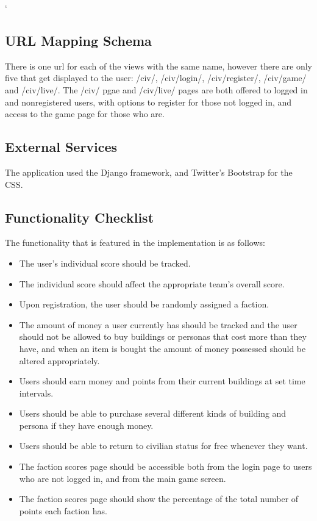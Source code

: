 `\documentclass{sig-alt-release2}
\begin{document}
\subsection{URL Mapping Schema}

There is one url for each of the views with the same name, however there are only five that get displayed to the user: /civ/, /civ/login/, /civ/register/, /civ/game/ and /civ/live/. The /civ/ pgae and /civ/live/ pages are both offered to logged in and nonregistered users, with options to register for those not logged in, and access to the game page for those who are.

\subsection{External Services}

The application used the Django framework, and Twitter's Bootstrap for the CSS. 

\subsection{Functionality Checklist}

The functionality that is featured in the implementation is as follows:

\begin{itemize}

\item The user's individual score should be tracked.

\item The individual score should affect the appropriate team's overall score.

\item Upon registration, the user should be randomly assigned a faction.

\item The amount of money a user currently has should be tracked and the user should not be allowed to buy buildings or personas that cost more than they have, and when an item is bought the amount of money possessed should be altered appropriately.

\item Users should earn money and points from their current buildings at set time intervals.

\item Users should be able to purchase several different kinds of building and persona if they have enough money.

\item Users should be able to return to civilian status for free whenever they want.

\item The faction scores page should be accessible both from the login page to users who are not logged in, and from the main game screen.

\item The faction scores page should show the percentage of the total number of points each faction has.

\end{itemize}
\end{document}
